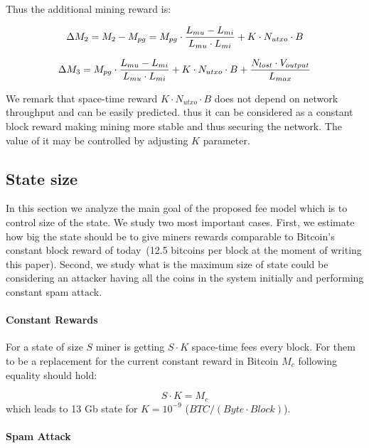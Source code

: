 \documentclass[]{llncs}   %
\begin{document}
Thus the additional mining reward is:

\begin{equation}
\Delta M_2 = M_2 - M_{pg} = M_{pg} \cdot {{L_{mu}-L_{mi}} \over {L_{mu} \cdot L_{mi}}} + K \cdot N_{utxo} \cdot B
\end{equation}

\begin{equation}
\Delta M_3 = M_{pg} \cdot {{L_{mu}-L_{mi}} \over {L_{mu} \cdot L_{mi}}} + K \cdot N_{utxo} \cdot B + {N_{lost} \cdot V_{output} \over L_{max}}
\end{equation}

We remark that space-time reward $K \cdot N_{utxo} \cdot B$ does not depend on network throughput and can be easily predicted. thus it can be considered as a constant block reward making mining more stable and thus securing the network. The value of it may be controlled by adjusting $K$ parameter.

\subsection{State size}

In this section we analyze the main goal of the proposed fee model which is to control size of the state. We study two most important cases. First, we estimate how big the state should be to give miners rewards comparable to Bitcoin's constant block reward of today~(12.5 bitcoins per block at the moment of writing this paper). Second, we study what is the maximum size of state could be considering an attacker having all the coins in the system initially and performing constant spam attack.

\paragraph{Constant Rewards}

For a state of size $S$ miner is getting $S \cdot K$ space-time fees every block. For them to be a replacement for the current constant reward in Bitcoin $M_c$ following equality should hold:

\begin{equation}
\label{eq:statesizeexp}
S \cdot K = M_c
\end{equation}
which leads to 13 Gb state for $K=10^{-9}$ ($BTC / (Byte \cdot Block)$).


\paragraph{Spam Attack}
\end{document}
